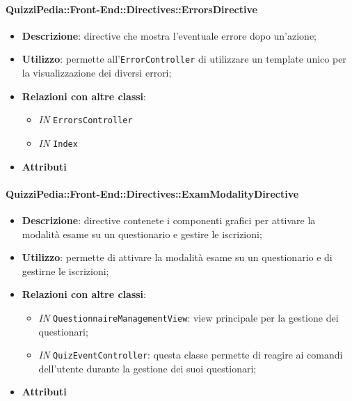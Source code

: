 \paragraph{QuizziPedia::Front-End::Directives::ErrorsDirective}
\begin{itemize}
	\item \textbf{Descrizione}: directive che mostra l'eventuale errore dopo un'azione;
	\item \textbf{Utilizzo}: permette all'\texttt{ErrorController} di utilizzare un template unico per la visualizzazione dei diversi errori;
	\item \textbf{Relazioni con altre classi}:
	\begin{itemize}
		\item \textit{IN} \texttt{ErrorsController}
		\item \textit{IN} \texttt{Index}
	\end{itemize}
	\item \textbf{Attributi}
\end{itemize}

\paragraph{QuizziPedia::Front-End::Directives::ExamModalityDirective}
\begin{itemize}
	\item \textbf{Descrizione}: directive contenete i componenti grafici per attivare la modalità esame su un questionario e gestire le iscrizioni;
	\item \textbf{Utilizzo}: permette di attivare la modalità esame su un questionario e di gestirne le iscrizioni;
	\item \textbf{Relazioni con altre classi}:
	\begin{itemize}
		\item \textit{IN} \texttt{QuestionnaireManagementView}: view principale per la gestione dei questionari;
		\item \textit{IN} \texttt{QuizEventController}: questa classe permette di reagire ai comandi dell'utente durante la gestione dei suoi questionari;
	\end{itemize}
	\item \textbf{Attributi}
\end{itemize}

